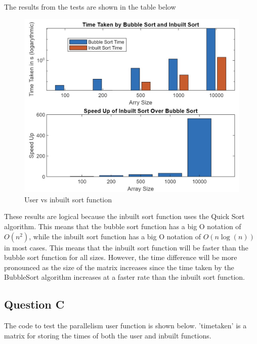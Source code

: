 The results from the tests are shown in the table below


\begin{figure}[H]
 \centering
 \includegraphics[width=0.6\columnwidth]{Figures/noPar}
 \caption{User vs inbuilt sort function}
 \label{fig:noPar}
\end{figure}

These results are logical because the inbuilt sort function uses the Quick Sort algorithm. 
This means that the bubble sort function has a big O notation of $O(n^2)$, while the inbuilt sort function has a big O notation of $O(n\log(n))$ in most cases.
This means that the inbuilt sort function will be faster than the bubble sort function for all sizes.
However, the time difference will be more pronounced as the size of the matrix increases since the time taken by the BubbleSort algorithm increases at a faster rate than the inbuilt sort function.

\subsection{Question C}
The code to test the parallelism  user function is shown below.
'timetaken' is a matrix for storing the times of both the user and inbuilt functions.

